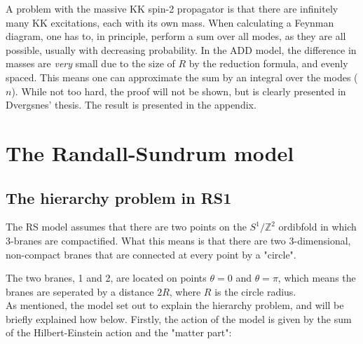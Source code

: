 \documentclass[11pt,a4paper]{article}
\begin{document}
%

A problem with the massive KK spin-2 propagator is that there are infinitely many KK excitations, each with its own mass. When calculating a Feynman diagram, one has to, in principle, perform a sum over all modes, as they are all possible, usually with decreasing probability. In the ADD model, the difference in masses are \emph{very} small due to the size of $R$ by the reduction formula, and evenly spaced. This means one can approximate the sum by an integral over the modes ($n$). While not too hard, the proof will not be shown, but is clearly presented in Dvergsnes' thesis. The result is presented in the appendix.

\section{The Randall-Sundrum model}
\subsection{The hierarchy problem in RS1}
The RS model assumes that there are two points on the $S^1/\mathbb{Z}^2$ ordibfold in which 3-branes are compactified. What this means is that there are two 3-dimensional, non-compact branes that are connected at every point by a "circle".

%	

The two branes, 1 and 2, are located on points $\theta = 0$ and $\theta = \pi$, which means the branes are seperated by a distance $2R$, where $R$ is the circle radius.\\
As mentioned, the model set out to explain the hierarchy problem, and will be briefly explained how below. Firstly, the action of the model is given by the sum of the Hilbert-Einstein action and the "matter part":
\end{document}
